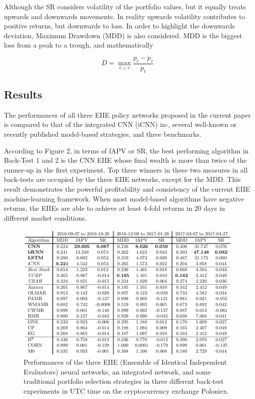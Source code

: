\documentclass[journal,onecolumn]{IEEEtran}
\begin{document}
Although the SR considers volatility of the portfolio values, but it equally treats upwards and downwards movements. In reality upwards volatility contributes to positive returns, but downwards to loss. In order to highlight the downwards deviation, Maximum Drawdown
(MDD) \cite{Magdon2004} is also considered. MDD is the biggest loss from a peak to a trough, and mathematically

\begin{equation}
	D = \max_{t>\tau} \frac{p_t - p_{\tau}}{p_t}
\end{equation}
\subsection{Results}
The performances of all three EIIE policy networks proposed in the current paper is compared to that of the integrated CNN (iCNN) in-\cite{Jiang2016}, several well-known or recently published model-based strategies, and three benchmarks.

According to Figure 2, in terms of fAPV or SR, the best performing algorithm in Back-Test 1 and 2 is the CNN EIIE whose final wealth is more than twice of the runner-up in the first experiment. Top three
winners in these two measures in all back-tests are occupied by the three EIIE networks, except for the MDD. This result demonstrates the powerful profitability and consistency of the current EIIE machine-learning framework. When most model-based algorithms have negative returns, the EIIEs are able to achieve at least 4-fold returns in 20 days in different market conditions.
\begin{figure}[!t]
	\centering
	\includegraphics[width=0.55\linewidth]{result.png}
	\caption{Performances of the three EIIE (Ensemble of Identical Independent Evaluators)
		neural networks, an integrated network, and some traditional portfolio selection
		strategies in three different back-test experiments in UTC time on the cryptocurrency exchange Poloniex.}
	\label{fig_result}
\end{figure}
\end{document}
